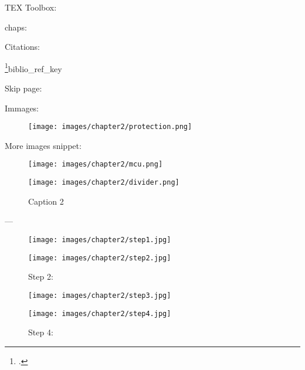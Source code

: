 TEX Toolbox:

chaps:
\label{chap:intro}
\label{chap:firegex}
\label{chap:ctfad}
\label{chap:nfproxy}
\label{chap:tests}
\label{chap:notes}
\label{chap:ending}

Citations:

\cite{riscv}
\footcite{Small description}{biblio_ref_key}

Skip page:

\vspace{\fill}
\newpage

Immages:

\begin{figure}[H]
  \centering
  \texttt{[image: images/chapter2/protection.png]}
\end{figure}

More images snippet:

\begin{figure}[H]
    \centering
    \begin{minipage}[b]{0.70\textwidth}
        \texttt{[image: images/chapter2/mcu.png]}
        \caption{Caption 1}\label{fig:mcu}
    \end{minipage}
    \hfill
    \begin{minipage}[b]{0.28\textwidth}
        \texttt{[image: images/chapter2/divider.png]}
        \caption{Caption 2}\label{fig:divider}
        \end{minipage}
\end{figure}

---

\begin{figure}[H]
    \centering
    \begin{minipage}[b]{0.45\textwidth}
      \texttt{[image: images/chapter2/step1.jpg]}
      \caption{Step 1:}\label{fig:step1}
    \end{minipage}
    \hfill
    \begin{minipage}[b]{0.45\textwidth}
      \texttt{[image: images/chapter2/step2.jpg]}
      \caption{Step 2:}\label{fig:step2}
      \end{minipage}
  \end{figure}

  \begin{figure}[H]
    \centering
    \begin{minipage}[b]{0.45\textwidth}
      \texttt{[image: images/chapter2/step3.jpg]}
      \caption{Step 3:}\label{fig:step2}
    \end{minipage}
    \hfill
    \begin{minipage}[b]{0.45\textwidth}
      \texttt{[image: images/chapter2/step4.jpg]}
      \caption{Step 4:}\label{fig:step2}
        \end{minipage}
\end{figure}

